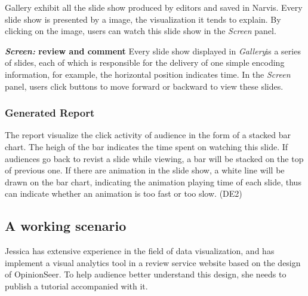 Gallery exhibit all the slide show produced by editors and saved in Narvis. Every slide show is presented by a image, the visualization it tends to explain. By clicking on the image, users can watch this slide show in the \textit{Screen} panel. 

\textbf{\textit{Screen:}  review and comment}
Every slide show displayed in \textit{Gallery}is a series of slides, each of which is responsible for the delivery of one simple encoding information, for example, the horizontal position indicates time. In the \textit{Screen} panel, users click buttons to move forward or backward to view these slides. 
\subsubsection{Generated Report}
The report visualize the click activity of audience in the form of a stacked bar chart. The heigh of the bar indicates the time spent on watching this slide. If audiences go back to revist a slide while viewing, a bar will be stacked on the top of previous one. If there are animation in the slide show, a white line will be drawn on the bar chart, indicating the animation playing time of each slide, thus can indicate whether an animation is too fast or too slow. (DE2)
\subsection{A working scenario}
Jessica has extensive experience in the field of data visualization, and has implement a visual analytics tool in a review service website based on the design of OpinionSeer\cite{wu_opinionseer:_2010}. To help audience better understand this design, she needs to publish a tutorial accompanied with it.

